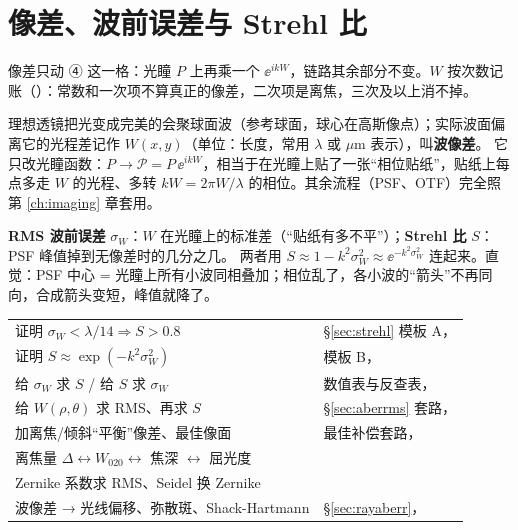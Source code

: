 \chapter{像差、波前误差与 Strehl 比}\label{ch:aberr}

\begin{idea}
像差只动 ④ 这一格：光瞳 $P$ 上再乘一个 $\ee^{ikW}$，链路其余部分不变。$W$ 按次数记账（\pageref{sec:p-ledger}）：常数和一次项不算真正的像差，二次项是离焦，三次及以上消不掉。
\end{idea}

\begin{idea}[像差在傅里叶光学里就是光瞳上多一个相位]
理想透镜把光变成完美的会聚球面波（参考球面，球心在高斯像点）；实际波面偏离它的光程差记作 $W(x,y)$（单位：长度，常用 $\lambda$ 或 $\mu$m 表示），叫\textbf{波像差}。
它只改光瞳函数：$P\to\mathcal P=P\,\ee^{ikW}$，相当于在光瞳上贴了一张“相位贴纸”，贴纸上每点多走 $W$ 的光程、多转 $kW=2\pi W/\lambda$ 的相位。其余流程（PSF、OTF）完全照第 \ref{ch:imaging} 章套用。

\textbf{RMS 波前误差} $\sigma_W$：$W$ 在光瞳上的标准差（“贴纸有多不平”）；\textbf{Strehl 比} $S$：PSF 峰值掉到无像差时的几分之几。
两者用 $S\approx1-k^2\sigma_W^2\approx\ee^{-k^2\sigma_W^2}$ 连起来。直觉：PSF 中心 = 光瞳上所有小波同相叠加；相位乱了，各小波的“箭头”不再同向，合成箭头变短，峰值就降了。
\end{idea}

\begin{warn}[本章题型速览]
\begin{tabular}{@{}P{6.2cm}P{9.6cm}@{}}
证明 $\sigma_W<\lambda/14\Rightarrow S>0.8$ & §\ref{sec:strehl} 模板 A，\pageref{ex:strehl-tplA}\\
证明 $S\approx\exp(-k^2\sigma_W^2)$ & 模板 B，\pageref{ex:strehl-tplB}\\
给 $\sigma_W$ 求 $S$ / 给 $S$ 求 $\sigma_W$ & 数值表与反查表，\pageref{sec:strehl-num}\\
给 $W(\rho,\theta)$ 求 RMS、再求 $S$ & §\ref{sec:aberrms} 套路，\pageref{sec:aberrms}\\
加离焦/倾斜“平衡”像差、最佳像面 & 最佳补偿套路，\pageref{rc:balance}\\
离焦量 $\Delta\leftrightarrow W_{020}\leftrightarrow$ 焦深 $\leftrightarrow$ 屈光度 & \pageref{sec:defocus-units}\\
Zernike 系数求 RMS、Seidel 换 Zernike & \pageref{sec:zernike}\\
波像差 → 光线偏移、弥散斑、Shack-Hartmann & §\ref{sec:rayaberr}，\pageref{sec:rayaberr}\\
\end{tabular}
\end{warn}

